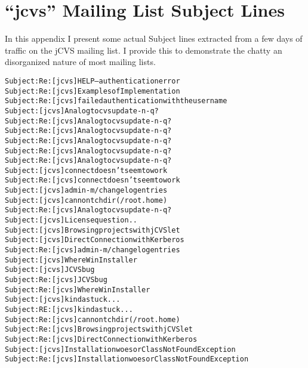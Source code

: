 
\appendix

\chapter{``jcvs'' Mailing List Subject Lines}
\label{cha:subject-appendix}
In this appendix I present some actual Subject lines extracted from a few days
of traffic on the jCVS mailing list. I provide this to demonstrate the chatty
an disorganized nature of most mailing lists.

\begin{alltt}
{\small{}Subject: Re: [jcvs] HELP--authentication error
Subject: Re: [jcvs] Examples of Implementation
Subject: Re: [jcvs] failed authentication with the user name
Subject: [jcvs] Analog to cvs update -n -q?
Subject: Re: [jcvs] Analog to cvs update -n -q?
Subject: Re: [jcvs] Analog to cvs update -n -q?
Subject: Re: [jcvs] Analog to cvs update -n -q?
Subject: Re: [jcvs] Analog to cvs update -n -q?
Subject: Re: [jcvs] Analog to cvs update -n -q?
Subject: [jcvs] connect doesn't seem to work
Subject: Re: [jcvs] connect doesn't seem to work
Subject: [jcvs] admin -m / change log entries
Subject: [jcvs] cannont chdir(/root.home)
Subject: Re: [jcvs] Analog to cvs update -n -q?
Subject: [jcvs] License question..
Subject: [jcvs] Browsing projects with jCVSlet
Subject: [jcvs] Direct Connection with Kerberos
Subject: Re: [jcvs] admin -m / change log entries
Subject: [jcvs] Where WinInstaller
Subject: [jcvs] JCVS bug
Subject: Re: [jcvs] JCVS bug
Subject: Re: [jcvs] Where WinInstaller
Subject: [jcvs] kinda stuck...
Subject: RE: [jcvs] kinda stuck...
Subject: Re: [jcvs] cannont chdir(/root.home)
Subject: Re: [jcvs] Browsing projects with jCVSlet
Subject: Re: [jcvs] Direct Connection with Kerberos
Subject: [jcvs] Installation woes or ClassNotFoundException
Subject: Re: [jcvs] Installation woes or ClassNotFoundException}
\end{alltt}

